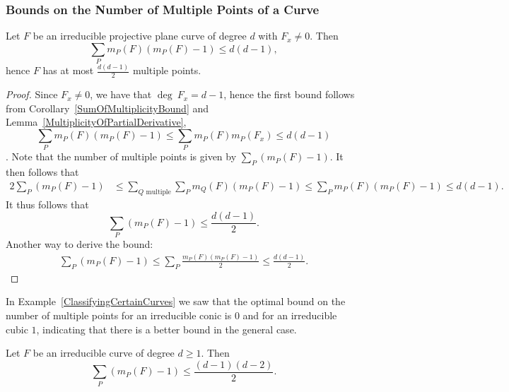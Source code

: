      \subsubsection{Bounds on the Number of Multiple Points of a Curve}
     \begin{proposition}
         Let $F$ be an irreducible projective plane curve of degree $d$ with $F_x \neq 0$. Then
         $$\sum_P m_P(F)(m_P(F)-1)\leq d(d-1),$$
         hence $F$ has at most $\frac{d(d-1)}{2}$ multiple points.
     \end{proposition}
     \begin{proof}
         Since $F_x \neq 0$, we have that $\deg \ F_x = d-1$, hence the first bound follows from Corollary~\ref{SumOfMultiplicityBound} and Lemma~\ref{MultiplicityOfPartialDerivative},
         $$\sum_P m_P(F)(m_P(F)-1) \leq \sum_P m_P(F)m_P(F_x) \leq d(d-1)$$.
         Note that the number of multiple points is given by $\sum_P (m_P(F)-1)$. It then follows that
         \begin{align*} 
            2\sum_P(m_P(F)-1) &\leq \sum_{Q \text{ multiple}}\sum_P m_Q(F)(m_P(F)-1)\leq \sum_P m_P(F)(m_P(F)-1) \leq d(d-1).
        \end{align*}
        It thus follows that 
        $$\sum_P (m_P(F)-1)\leq \frac{d(d-1)}{2}.$$
        Another way to derive the bound:
        \begin{align*}
            \sum_P (m_P(F)-1) \leq \sum_P \frac{m_P(F)(m_P(F)-1)}{2} \leq \frac{d(d-1)}{2}.
        \end{align*}
     \end{proof}
     In Example~\ref{ClassifyingCertainCurves} we saw that the optimal bound on the number of multiple points for an irreducible conic is $0$ and for an irreducible cubic $1$, indicating that there is a better bound in the general case. 
     \begin{theorem}
         Let $F$ be an irreducible curve of degree $d\geq 1$. Then 
         $$\sum_P (m_P(F)-1) \leq \frac{(d-1)(d-2)}{2}.$$
     \end{theorem}
